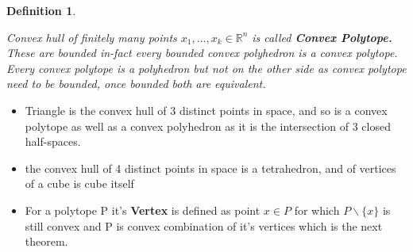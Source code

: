\documentclass[oneside]{book}
\newtheorem{mydef}{Definition}
\begin{document}
  \begin{mydef} \label{d:6}
  
  Convex hull of finitely many points $x_1,\ldots ,x_k \in \mathbb{R}^n $ is called \textbf{Convex Polytope.} 
 These are bounded in-fact every bounded convex polyhedron  is a convex polytope.\\
  Every convex polytope is a polyhedron but not on the other side as convex polytope need to be bounded, once bounded both are equivalent.
 
 
  \end{mydef}
  

\begin{itemize}
\item

Triangle is the convex hull of 3 distinct points in space, and so is a convex polytope as well as a convex polyhedron as it is the intersection of 3 closed half-spaces.

\item
  the convex hull of 4 distinct points in space is a tetrahedron, and of vertices of a cube is cube itself 
 
 \item
 For a polytope P it's \textbf{Vertex} is defined as point $x \in P$ for which $P \backslash \{x\} $ is  still convex and P is convex combination of it's vertices which is  the next theorem. 
 \end{itemize}
\end{document}

